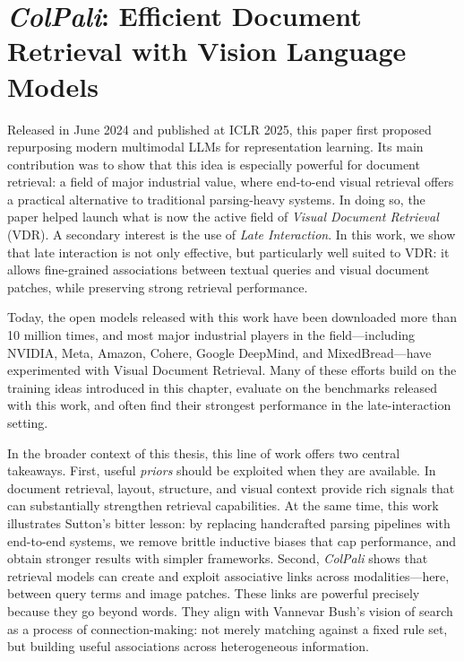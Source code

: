\setchapterpreamble[u]{\margintoc}
\chapter{\textit{ColPali}: Efficient Document Retrieval with Vision Language Models}
\label{ch:colpali}


\begin{sagekaobox}[frametitle=Paper Context]
Released in June 2024 and published at ICLR 2025, this paper first proposed repurposing modern multimodal LLMs for representation learning. Its main contribution was to show that this idea is especially powerful for document retrieval: a field of major industrial value, where end-to-end visual retrieval offers a practical alternative to traditional parsing-heavy systems. In doing so, the paper helped launch what is now the active field of \emph{Visual Document Retrieval} (VDR). A secondary interest is the use of \emph{Late Interaction}. In this work, we show that late interaction is not only effective, but particularly well suited to VDR: it allows fine-grained associations between textual queries and visual document patches, while preserving strong retrieval performance. 

Today, the open models released with this work have been downloaded more than 10 million times, and most major industrial players in the field---including NVIDIA, Meta, Amazon, Cohere, Google DeepMind, and MixedBread---have experimented with Visual Document Retrieval. Many of these efforts build on the training ideas introduced in this chapter, evaluate on the benchmarks released with this work, and often find their strongest performance in the late-interaction setting.

In the broader context of this thesis, this line of work offers two central takeaways. First, useful \emph{priors} should be exploited when they are available. In document retrieval, layout, structure, and visual context provide rich signals that can substantially strengthen retrieval capabilities. At the same time, this work illustrates Sutton's bitter lesson: by replacing handcrafted parsing pipelines with end-to-end systems, we remove brittle inductive biases that cap performance, and obtain stronger results with simpler frameworks.  Second, \emph{ColPali}  shows that retrieval models can create and exploit associative links across modalities---here, between query terms and image patches. These links are powerful precisely because they go beyond words. They align with Vannevar Bush's vision of search as a process of connection-making: not merely matching against a fixed rule set, but building useful associations across heterogeneous information.
\end{sagekaobox}

